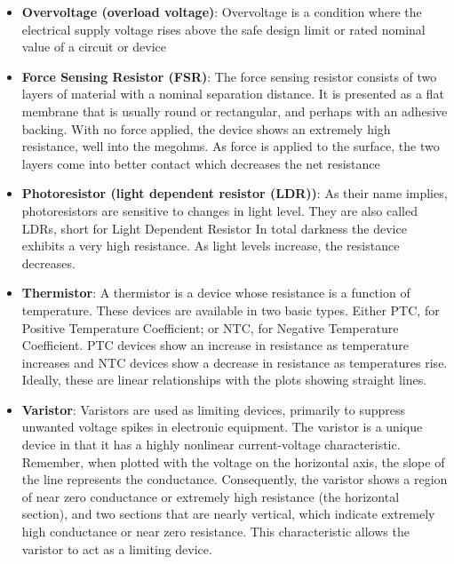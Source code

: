 \documentclass{report}
\begin{document}
\begin{itemize}
            \bigbreak \noindent 
            \bigbreak \noindent 
            \bigbreak \noindent 
            Note that the fourth band is spaced away from the others to avoid accidentally reversing the order.
        \item \textbf{Overvoltage (overload voltage)}: Overvoltage is a condition where the electrical supply voltage rises above the safe design limit or rated nominal value of a circuit or device
        \item \textbf{Force Sensing Resistor (FSR)}: The force sensing resistor consists of two layers of material with a nominal separation distance. It is presented as a flat membrane that is usually round or rectangular, and perhaps with an adhesive backing. 
            \bigbreak \noindent 
            With no force applied, the device shows an extremely high resistance, well into the megohms. As force is applied to the surface, the two layers come into better contact which decreases the net resistance
        \item \textbf{Photoresistor (light dependent resistor (LDR))}:  As their name implies, photoresistors are sensitive to changes in light level. They are also called LDRs, short for Light Dependent Resistor
            \bigbreak \noindent 
             In total darkness the device exhibits a very high resistance. As light levels increase, the resistance decreases.
        \item \textbf{Thermistor}: A thermistor is a device whose resistance is a function of temperature. These devices are available in two basic types. Either PTC, for Positive Temperature Coefficient; or NTC, for Negative Temperature Coefficient. PTC devices show an increase in resistance as temperature increases and NTC devices show a decrease in resistance as temperatures rise. Ideally, these are linear relationships with the plots showing straight lines.
        \item \textbf{Varistor}: Varistors are used as limiting devices, primarily to suppress unwanted voltage spikes in electronic equipment. The varistor is a unique device in that it has a highly nonlinear current-voltage characteristic. 
            \bigbreak \noindent 
            Remember, when plotted with the voltage on the horizontal axis, the slope of the line represents the conductance. Consequently, the varistor shows a region of near zero conductance or extremely high resistance (the horizontal section), and two sections that are nearly vertical, which indicate extremely high conductance or near zero resistance. This characteristic allows the varistor to act as a limiting device.

\end{itemize}
\end{document}
